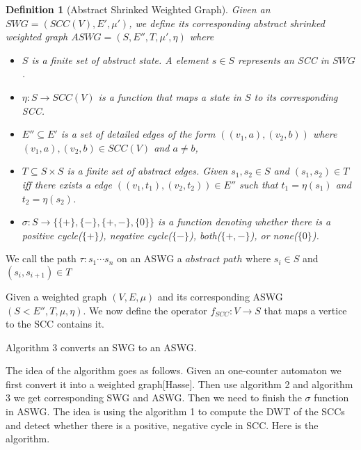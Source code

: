 \documentclass[12pt]{article}
\newtheorem{definition}{Definition}
\begin{document}
\begin{definition}[Abstract Shrinked Weighted Graph]
	Given an $SWG = (SCC(V), E', \mu') $, we define its corresponding abstract shrinked weighted graph $ASWG = (S, E'', T, \mu', \eta)$ where 
\begin{itemize}
\item $S$ is a finite set of abstract state. A element  $s\in S$ represents an SCC in $SWG$.
\item $\eta: S\rightarrow SCC(V)$ is a function that maps a state in $S$ to its corresponding SCC.
\item $E'' \subseteq E'$ is a set of detailed edges of the form $((v_1,a), (v_2, b))$ where $(v_1, a), (v_2, b)\in SCC(V)$ and $a \ne b$,
\item $T\subseteq S \times S$ is a finite set of abstract edges. Given $s_1, s_2\in S$ and $(s_1, s_2)\in T$ iff there exists a edge $((v_1,t_1), (v_2, t_2))\in E''$ such that $t_1 = \eta(s_1)$ and $t_2 = \eta(s_2)$. 
\item $\sigma: S\rightarrow \{\{+\}, \{-\}, \{+,-\}, \{0\}\}$ is a function denoting whether there is a positive cycle($\{+\}$), negative cycle($\{-\}$), both($\{+,-\}$), or none($\{0\}$).

 
\end{itemize}
\end{definition}

We call the path $\tau: s_1\cdots s_n$ on an ASWG a $abstract $ $path$ where $s_i\in S$ and $(s_i, s_{i+1})\in T$

Given a weighted graph $(V,E,\mu)$ and its corresponding ASWG $(S<E'',T,\mu,\eta)$. We now define the operator $f_{SCC}: V\rightarrow S$ that maps a vertice to the SCC contains it. 

Algorithm 3 converts an SWG to an ASWG.

The idea of the algorithm goes as follows. Given an one-counter automaton we first convert it into a weighted graph[Hasse]. Then use algorithm 2 and algorithm 3 we get corresponding SWG and ASWG. Then we need to finish the $\sigma$ function in ASWG. The idea is using the algorithm 1 to compute the DWT of the SCCs and detect whether there is a positive, negative cycle in SCC. Here is the algorithm.
\end{document}
